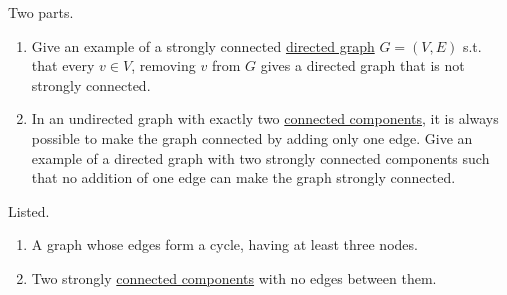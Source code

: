   \begin{exercise}
    Two parts. 
    \begin{enumerate}
      \item Give an example of a strongly connected \hyperref[def:directed-graph]{directed graph} $G = (V, E)$ s.t. that every $v \in V$, removing $v$ from $G$ gives a directed graph that is not strongly connected. 
      \item In an undirected graph with exactly two \hyperref[pst-def:connected-components]{connected components}, it is always possible to make the graph connected by adding only one edge. Give an example of a directed graph with two strongly connected components such that no addition of one edge can make the graph strongly connected.
    \end{enumerate}
  \end{exercise}
  \begin{solution}
    Listed. 
    \begin{enumerate}
      \item A graph whose edges form a cycle, having at least three nodes.
      \item Two strongly \hyperref[pst-def:connected-components]{connected components} with no edges between them.
    \end{enumerate}
  \end{solution} 

